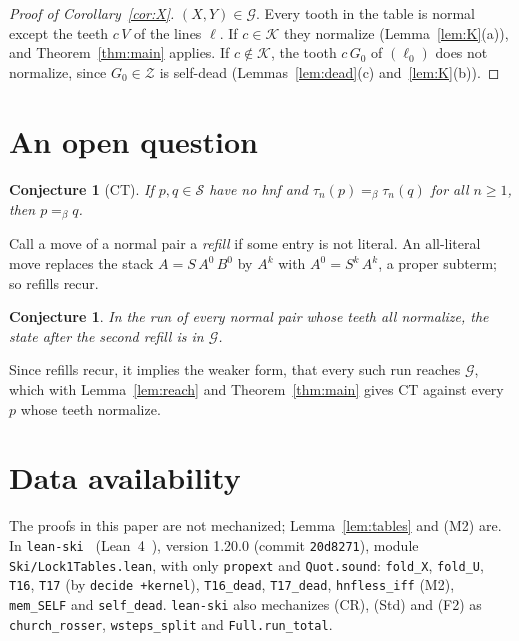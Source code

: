 \documentclass[11pt]{amsart}
\newtheorem{conjecture}[theorem]{Conjecture}
\theoremstyle{definition}
\newcommand{\Ter}{\mathcal S}
\newcommand{\conv}{=_\beta}
\newcommand{\Gc}{\mathcal G}
\newcommand{\Kc}{\mathcal K}
\newcommand{\Zc}{\mathcal Z}
\begin{document}
\begin{proof}[Proof of Corollary~\ref{cor:X}]
$(X,Y)\in\Gc$. Every tooth in the table is normal except the teeth $c\,V$ of the lines $\ell$. If
$c\in\Kc$ they normalize (Lemma~\ref{lem:K}(a)), and Theorem~\ref{thm:main} applies. If $c\notin\Kc$,
the tooth $c\,G_0$ of $(\ell_0)$ does not normalize, since $G_0\in\Zc$ is self-dead
(Lemmas~\ref{lem:dead}(c) and~\ref{lem:K}(b)).
\end{proof}

\section{An open question}\label{sec:open}

\begin{conjecture}[CT]
If $p,q\in\Ter$ have no hnf and $\tau_n(p)\conv\tau_n(q)$ for all $n\ge1$, then $p\conv q$.
\end{conjecture}

\noindent Call a move of a normal pair a \emph{refill} if some entry is not literal. An all-literal
move replaces the stack $A=S\,A^0\,B^0$ by $A^k$ with $A^0=S^k\,A^k$, a proper subterm; so refills
recur.

\begin{conjecture}\label{conj:entry}
In the run of every normal pair whose teeth all normalize, the state after the second refill is
in $\Gc$.
\end{conjecture}

\noindent Since refills recur, it implies the weaker form, that every such run reaches $\Gc$, which
with Lemma~\ref{lem:reach} and Theorem~\ref{thm:main} gives CT against every $p$ whose teeth
normalize.

\section*{Data availability}
\sloppy
The proofs in this paper are not mechanized; Lemma~\ref{lem:tables} and (M2) are. In
\texttt{lean-ski}~\citep{leanski} (Lean~4~\citep{lean4}), version 1.20.0 (commit \texttt{20d8271}), module \texttt{Ski/Lock1Tables.lean}, with
only \texttt{propext} and \texttt{Quot.sound}: \texttt{fold\_X}, \texttt{fold\_U}, \texttt{T16},
\texttt{T17} (by \texttt{decide +kernel}), \texttt{T16\_dead}, \texttt{T17\_dead},
\texttt{hnfless\_iff} (M2), \texttt{mem\_SELF} and \texttt{self\_dead}. \texttt{lean-ski} also
mechanizes (CR), (Std) and (F2) as \texttt{church\_rosser}, \texttt{wsteps\_split} and
\texttt{Full.run\_total}.



\end{document}
